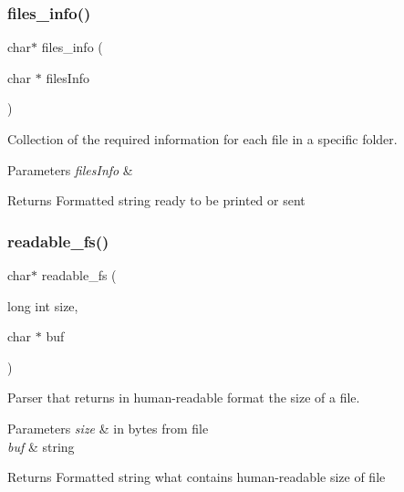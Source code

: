 \subsubsection{files\+\_\+info()}
{\footnotesize\ttfamily char$\ast$ files\+\_\+info (\begin{DoxyParamCaption}\item[{char $\ast$}]{files\+Info }\end{DoxyParamCaption})}



Collection of the required information for each file in a specific folder. 


\begin{DoxyParams}{Parameters}
{\em files\+Info} & \\
\hline
\end{DoxyParams}
\begin{DoxyReturn}{Returns}
Formatted string ready to be printed or sent 
\end{DoxyReturn}
\mbox{\label{fileserv_8h_aaa60420f4ed2522f7e58eedb72afea48}} 
\subsubsection{readable\+\_\+fs()}
{\footnotesize\ttfamily char$\ast$ readable\+\_\+fs (\begin{DoxyParamCaption}\item[{long int}]{size,  }\item[{char $\ast$}]{buf }\end{DoxyParamCaption})}



Parser that returns in human-\/readable format the size of a file. 


\begin{DoxyParams}{Parameters}
{\em size} & in bytes from file \\
\hline
{\em buf} & string \\
\hline
\end{DoxyParams}
\begin{DoxyReturn}{Returns}
Formatted string what contains human-\/readable size of file 
\end{DoxyReturn}
